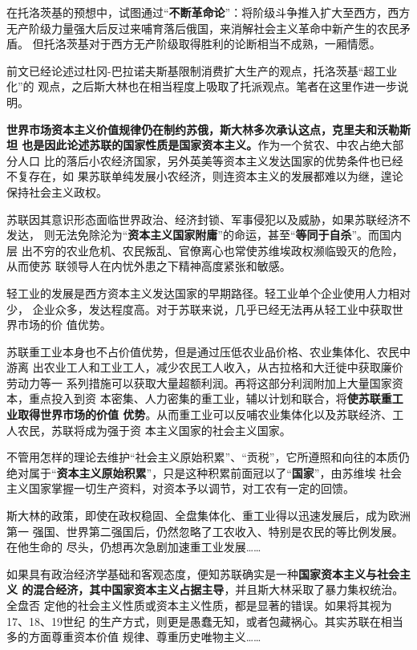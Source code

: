 在托洛茨基的预想中，试图通过“\textbf{不断革命论}”：将阶级斗争推入扩大至西方，西方
无产阶级力量强大后反过来哺育落后俄国，来消解社会主义革命中新产生的农民矛盾。
但托洛茨基对于西方无产阶级取得胜利的论断相当不成熟，一厢情愿。

前文已经论述过杜冈-巴拉诺夫斯基限制消费扩大生产的观点，托洛茨基“超工业化”的
观点，之后斯大林也在相当程度上吸取了托派观点。笔者在这里作进一步说明。

\textbf{世界市场资本主义价值规律仍在制约苏俄，斯大林多次承认这点，克里夫和沃勒斯坦
  也是因此论述苏联的国家性质是国家资本主义。}作为一个贫农、中农占绝大部分人口
比的落后小农经济国家，另外英美等资本主义发达国家的优势条件也已经不复存在，如
果苏联单纯发展小农经济，则连资本主义的发展都难以为继，遑论保持社会主义政权。

苏联因其意识形态面临世界政治、经济封锁、军事侵犯以及威胁，如果苏联经济不发达，
则无法免除沦为“\textbf{资本主义国家附庸}”的命运，甚至“\textbf{等同于自杀}”。而国内层
出不穷的农业危机、农民叛乱、官僚离心也常使苏维埃政权濒临毁灭的危险，从而使苏
联领导人在内忧外患之下精神高度紧张和敏感。

轻工业的发展是西方资本主义发达国家的早期路径。轻工业单个企业使用人力相对少，
企业众多，发达程度高。对于苏联来说，几乎已经无法再从轻工业中获取世界市场的价
值优势。

苏联重工业本身也不占价值优势，但是通过压低农业品价格、农业集体化、农民中游离
出农业工人和工业工人，减少农民工人收入，从古拉格和大迁徙中获取廉价劳动力等一
系列措施可以获取大量超额利润。再将这部分利润附加上大量国家资本，重点投入到资
本密集、人力密集的重工业，辅以计划和联合，将\textbf{使苏联重工业取得世界市场的价值
  优势}。从而重工业可以反哺农业集体化以及苏联经济、工人农民，苏联将成为强于资
本主义国家的社会主义国家。

不管用怎样的理论去维护“社会主义原始积累”、“贡税”，它所遵照和向往的本质仍
绝对属于“\textbf{资本主义原始积累}”，只是这种积累前面冠以了“\textbf{国家}”，由苏维埃
社会主义国家掌握一切生产资料，对资本予以调节，对工农有一定的回馈。

斯大林的政策，即使在政权稳固、全盘集体化、重工业得以迅速发展后，成为欧洲第一
强国、世界第二强国后，仍然忽略了工农收入、特别是农民的等比例发展。在他生命的
尽头，仍想再次急剧加速重工业发展……

如果具有政治经济学基础和客观态度，便知苏联确实是一种\textbf{国家资本主义与社会主义
  的混合经济，其中国家资本主义占据主导}，并且斯大林采取了暴力集权统治。全盘否
定他的社会主义性质或资本主义性质，都是显著的错误。如果将其视为17、18、19世纪
的生产方式，则更是愚蠢无知，或者包藏祸心。其实苏联在相当多的方面尊重资本价值
规律、尊重历史唯物主义……

